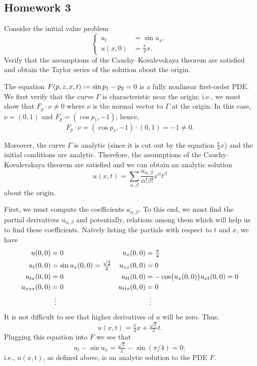 \subsection{Homework 3}
\begin{problem}
  Consider the initial value problem
  \[
    \left\{
      \begin{aligned}
        u_t&=\sin u_x,\\
        u(x,0)&=\tfrac{\pi}{4}x.
      \end{aligned}
    \right.
  \]
  Verify that the assumptions of the Cauchy--Kovalevskaya theorem are
  satisfied and obtain the Taylor series of the solution about the origin.
\end{problem}
\begin{solution*}
  The equation \(F(p,z,x,t)\defeq\sin p_1-p_2=0\) is a fully nonlinear
  first-order PDE. We first verify that the curve \(\Gamma\) is
  characteristic near the origin; i.e., we must show that \(F_p\cdot\nu\neq
  0\) where \(\nu\) is the normal vector to \(\Gamma\) at the origin. In
  this case, \(\nu=(0,1)\) and \(F_p=(\cos p_1,-1)\); hence,
  \[
    F_p\cdot\nu= (\cos p_1,-1)\cdot(0,1)=-1\neq 0.
  \]

  Moreover, the curve \(\Gamma\) is analytic (since it is cut out by the
  equation \(\frac{\pi}{4}x\)) and the initial conditions are
  analytic. Therefore, the assumptions of the Cauchy--Kovalevskaya theorem
  are satisfied and we can obtain an analytic solution
  \[
    u(x,t)=\sum_{\alpha,\beta} \frac{a_{\alpha,\beta}}{\alpha!\beta!}
    x^\alpha t^\beta
  \]
  about the origin.

  First, we must compute the coefficients \(a_{\alpha,\beta}\). To this
  end, we must find the partial derivatives \(u_{\alpha,\beta}\) and
  potentially, relations among them which will help us to find these
  coefficients. Naïvely listing the partials with respect to \(t\) and
  \(x\), we have
  \begin{align*}
    u(0,0)&=0&
    u_x(0,0)&=\tfrac{\pi}{4}\\
    u_t(0,0)&=\sin u_x(0,0)=\tfrac{\sqrt{2}}{2}&
    u_{xx}(0,0)&=0\\
    u_{tx}(0,0)&=0&
    u_{tt}(0,0)&=-\cos\bigl(u_x(0,0)\bigr)u_{xt}(0,0)=0\\
    u_{xxx}(0,0)&=0&
    u_{ttx}(0,0)&=0\\
    &\vdotswithin{=}&&\vdotswithin{=}
  \end{align*}
  It is not difficult to see that higher derivatives of \(u\) will be
  zero. Thus,
  \[
    u(x,t)=\tfrac{\pi}{4}x+\tfrac{\sqrt{2}}{2}t.
  \]
  Plugging this equation into \(F\) we see that
  \[
    u_t-\sin u_x=\tfrac{\sqrt{2}}{2}-\sin(\pi/4)=0;
  \]
  i.e., \(u(x,t)\), as defined above, is an analytic solution to the PDE
  \(F\).
\end{solution*}

